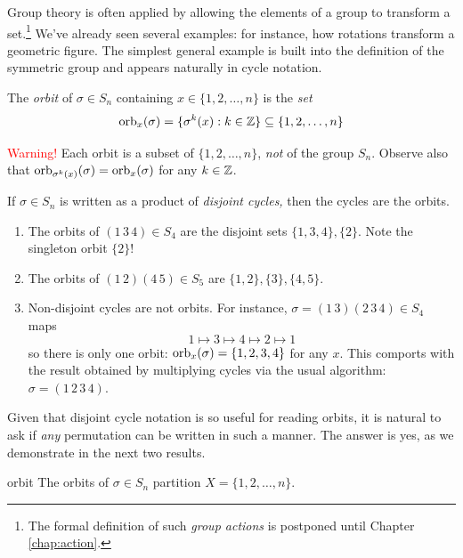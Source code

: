 Group theory is often applied by allowing the elements of a group to transform a set.\footnote{The formal definition of such \emph{group actions} is postponed until Chapter \ref{chap:action}.} We've already seen several examples: for instance, how rotations transform a geometric figure. The simplest general example is built into the definition of the symmetric group and appears naturally in cycle notation.

\begin{defn}{}{}
	The \emph{orbit} of $\sigma\in S_n$ containing $x\in\{1,2,\ldots,n\}$ is the \emph{set}
	\[
		\mathrm{orb}_x(\sigma)=\{\sigma^k(x):k\in\mathbb{Z}\}\subseteq\{1,2,\ldots,n\}
	\]
\end{defn}

\textcolor{red}{Warning!} Each orbit is a subset of $\{1,2,\ldots,n\}$, \emph{not} of the group $S_n$.\smallbreak
Observe also that $\mathrm{orb}_{\sigma^k(x)}(\sigma)=\mathrm{orb}_x(\sigma)$ for any $k\in\mathbb{Z}$.


\begin{examples}{}{}
	If $\sigma\in S_n$ is written as a product of \emph{disjoint cycles,} then the cycles are the orbits.
	\begin{enumerate}
	  \item The orbits of $(1\,3\,4)\in S_4$ are the disjoint sets $\{1,3,4\},\{2\}$. Note the singleton orbit $\{2\}$!
	  \item The orbits of $(1\,2)(4\,5)\in S_5$ are $\{1,2\},\{3\},\{4,5\}$.
	  \item Non-disjoint cycles are not orbits. For instance, $\sigma=(1\,3)(2\,3\,4)\in S_4$ maps
		\[
			1\mapsto 3\mapsto 4\mapsto 2\mapsto 1
		\]
		so there is only one orbit: $\mathrm{orb}_x(\sigma)=\{1,2,3,4\}$ for any $x$. This comports with the result obtained by multiplying cycles via the usual algorithm: $\sigma=(1\,2\,3\,4)$.
	\end{enumerate}
\end{examples}

Given that disjoint cycle notation is so useful for reading orbits, it is natural to ask if \emph{any} permutation can be written in such a manner. The answer is yes, as we demonstrate in the next two results.


\begin{lemm}{}{orbit}
	The orbits of $\sigma\in S_n$ partition $X=\{1,2,\ldots,n\}$.
\end{lemm}

